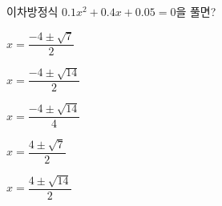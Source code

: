 이차방정식 $0.1x^2+0.4x+0.05=0$을 풀면?
\begin{choices32}{\rule[-3ex]{0pt}{8ex}$x=\dfrac{-4\pm\sqrt{7}}{2}$}{\rule[-3ex]{0pt}{8ex}$x=\dfrac{-4\pm\sqrt{14}}{2}$}{\rule[-3ex]{0pt}{8ex}$x=\dfrac{-4\pm\sqrt{14}}{4}$}{\rule[-3ex]{0pt}{8ex}$x=\dfrac{4\pm\sqrt{7}}{2}$}{\rule[-3ex]{0pt}{8ex}$x=\dfrac{4\pm\sqrt{14}}{2}$}\end{choices32}
